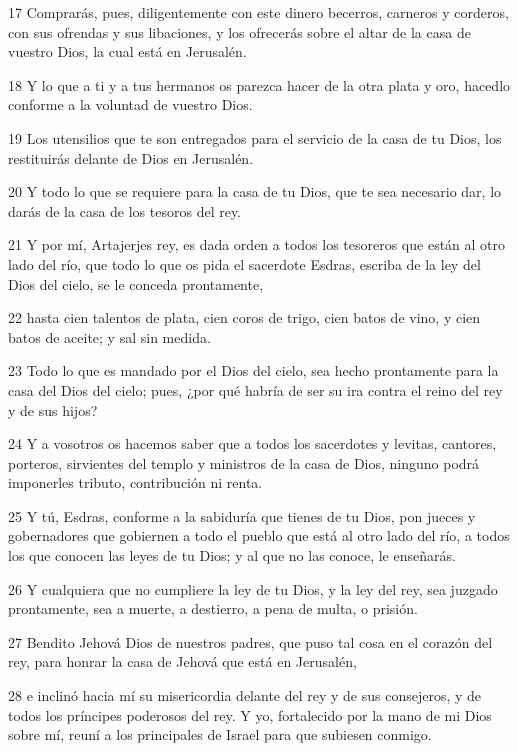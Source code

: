 \par 17 Comprarás, pues, diligentemente con este dinero becerros, carneros y corderos, con sus ofrendas y sus libaciones, y los ofrecerás sobre el altar de la casa de vuestro Dios, la cual está en Jerusalén.
\par 18 Y lo que a ti y a tus hermanos os parezca hacer de la otra plata y oro, hacedlo conforme a la voluntad de vuestro Dios.
\par 19 Los utensilios que te son entregados para el servicio de la casa de tu Dios, los restituirás delante de Dios en Jerusalén.
\par 20 Y todo lo que se requiere para la casa de tu Dios, que te sea necesario dar, lo darás de la casa de los tesoros del rey.
\par 21 Y por mí, Artajerjes rey, es dada orden a todos los tesoreros que están al otro lado del río, que todo lo que os pida el sacerdote Esdras, escriba de la ley del Dios del cielo, se le conceda prontamente,
\par 22 hasta cien talentos de plata,  cien coros de trigo, cien batos de vino, y cien batos de aceite; y sal sin medida.
\par 23 Todo lo que es mandado por el Dios del cielo, sea hecho prontamente para la casa del Dios del cielo; pues, ¿por qué habría de ser su ira contra el reino del rey y de sus hijos?
\par 24 Y a vosotros os hacemos saber que a todos los sacerdotes y levitas, cantores, porteros, sirvientes del templo y ministros de la casa de Dios, ninguno podrá imponerles tributo, contribución ni renta.
\par 25 Y tú, Esdras, conforme a la sabiduría que tienes de tu Dios, pon jueces y gobernadores que gobiernen a todo el pueblo que está al otro lado del río, a todos los que conocen las leyes de tu Dios; y al que no las conoce, le enseñarás.
\par 26 Y cualquiera que no cumpliere la ley de tu Dios, y la ley del rey, sea juzgado prontamente, sea a muerte, a destierro, a pena de multa, o prisión.
\par 27 Bendito Jehová Dios de nuestros padres, que puso tal cosa en el corazón del rey, para honrar la casa de Jehová que está en Jerusalén,
\par 28 e inclinó hacia mí su misericordia delante del rey y de sus consejeros, y de todos los príncipes poderosos del rey. Y yo, fortalecido por la mano de mi Dios sobre mí, reuní a los principales de Israel para que subiesen conmigo. 

